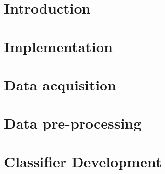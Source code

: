 \documentclass[12pt]{report}
\begin{document}



%
%

\tableofcontents{}
\listoffigures
\listoftables

\chapter{Introduction}



% 

\chapter{Implementation}


\chapter{Data acquisition}
\label{data-acquisition}


\chapter{Data pre-processing}


% 

% 

% 

% 

\chapter{Classifier Development}
\label{classifier-development}

\end{document}
